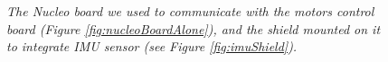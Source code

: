 \begin{description}
\begin{figure}
	\begin{minipage}[c]{.5\textwidth}
	\centering	
	\end{minipage}
	\begin{minipage}[c]{.5\textwidth}
	\end{minipage}
	\caption{\textit{The Nucleo board we used to communicate with the motors control board (Figure \ref{fig:nucleoBoardAlone}), and the shield mounted on it to integrate \ac{IMU} sensor (see Figure \ref{fig:imuShield}).}}
	\label{fig:nucleoBoard}
\end{figure}


\end{description}
